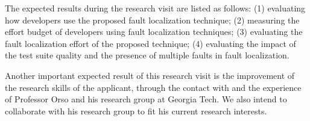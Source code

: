 \documentclass[12pt,a4paper,espaco=umemeio,noindentfirst,oneside,openany,tocpage=plain,pnumromarab,ruledheader,time,anapcustomindent]{sty/abnt}
\begin{document}
The expected results during the research visit are listed as follows: (1) evaluating how developers use the proposed fault localization technique; 
(2) measuring the effort budget of developers using fault localization techniques; (3) evaluating the fault localization effort of the proposed 
technique; (4) evaluating the impact of the test suite quality and the presence of multiple faults in fault localization.

Another important expected result of this research visit is the improvement of the research skills of the applicant, through the contact with and 
the experience of Professor Orso and his research group at Georgia Tech. We also intend to collaborate with his research group to fit his current 
research interests.





\end{document}
